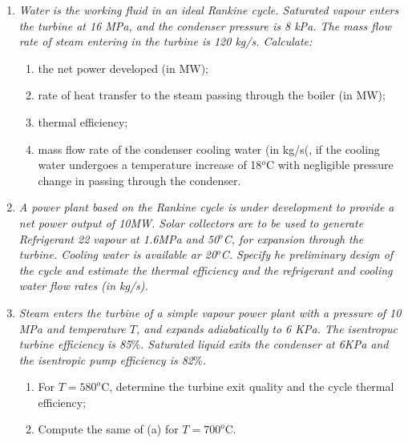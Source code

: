 \begin{enumerate}
\item {\it Water is the working fluid in an ideal Rankine cycle. Saturated vapour enters the turbine at 16 MPa, and the condenser pressure is 8 kPa. The mass flow rate of steam entering in the turbine is 120 kg/s. Calculate:
\begin{enumerate}
\item the net power developed (in MW);
\item rate of heat transfer to the steam passing through the boiler (in MW);
\item thermal efficiency;
\item mass flow rate of the condenser cooling water (in kg/s(, if the cooling water undergoes a temperature increase of 18$^{o}$C with negligible pressure change in passing through the condenser.
\end{enumerate} 
}


\item {\it A power plant based on the Rankine cycle is under development to provide a net power output of 10MW. Solar collectors are to be used to generate Refrigerant 22 vapour at 1.6MPa and 50$^{o}$C, for expansion through the turbine. Cooling water is available ar 20$^{o}$C. Specify he preliminary design of the cycle and estimate the thermal efficiency and the refrigerant and cooling water flow rates (in kg/s).}



\item {\it Steam enters the turbine of a simple vapour power plant with a pressure of 10 MPa and temperature $T$, and expands adiabatically to 6 KPa. The isentropuc turbine efficiency is 85$\%$. Saturated liquid exits the condenser at 6KPa and the isentropic pump efficiency is 82$\%$.
\begin{enumerate}
\item For $T=580^{o}$C, determine the turbine exit quality and the cycle thermal efficiency;
\item Compute the same of (a) for $T=700^{o}$C.
\end{enumerate}
}







\end{enumerate}
